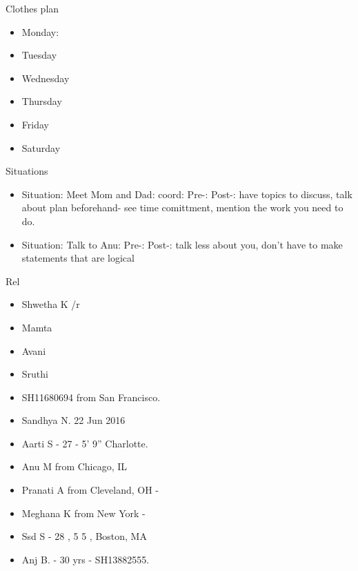 \documentclass[serif, mathserif, final]{beamer}
\begin{document}
\begin{frame}
\begin{columns}
\begin{column}{0.25\linewidth}
  \begin{block}{Clothes plan} 
    \begin{itemize}
      \tiny \item \tiny Monday: 
    \item \tiny Tuesday
    \item \tiny Wednesday
    \item \tiny Thursday
    \item \tiny Friday
    \item \tiny Saturday
    \end{itemize} 
  \end{block}
  
      \begin{block}{Situations}
        \begin{itemize}
          \tiny \item \tiny Situation: Meet Mom and Dad:  coord:
          Pre-:  Post-: have topics to discuss, talk about plan beforehand- see time comittment, mention the work you need to do.
        \item \tiny Situation: Talk to Anu:  Pre-:   Post-:  talk less
          about you, don't have to make statements that are logical 
        \end{itemize} 
      \end{block} 


\begin{block}{Rel} 
  \begin{itemize} 
  \small \item \small Shwetha K /r
    \item \small Mamta
    \item \small Avani 
    \item \small Sruthi 
    \item \small SH11680694 from San Francisco. 
    \item \small Sandhya N. 22 Jun 2016 
    \item \small Aarti S - 27 - 5' 9'' Charlotte.       
    \item \small Anu M from Chicago, IL 
    \item \small Pranati A from Cleveland, OH - 
    \item \small Meghana K from New York - 
    \item \small Ssd S - 28 , 5 5 , Boston, MA 
    \item \small Anj B. - 30 yrs - SH13882555.
  \end{itemize}
\end{block}


\end{column}
\end{columns}
\end{frame}
\end{document}
